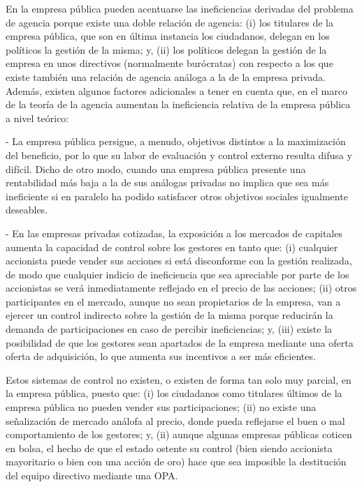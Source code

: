 \documentclass[10pt,a4paper]{article}
\begin{document}
En la empresa pública pueden acentuarse las ineficiencias derivadas del problema de agencia porque existe una doble relación de agencia: (i) los titulares de la empresa pública, que son en última instancia los ciudadanos, delegan en los políticos la gestión de la misma; y, (ii) los políticos delegan la gestión de la empresa en unos directivos (normalmente burócratas) con respecto a los que existe también una relación de agencia análoga a la de la empresa privada. Además, existen algunos factores adicionales a tener en cuenta que, en el marco de la teoría de la agencia aumentan la ineficiencia relativa de la empresa pública a nivel teórico:

- La empresa pública persigue, a menudo, objetivos distintos a la maximización del beneficio, por lo que su labor de evaluación y control externo resulta difusa y difícil. Dicho de otro modo, cuando una empresa pública presente una rentabilidad más baja a la de sus análogas privadas no implica que sea más ineficiente si en paralelo ha podido satisfacer otros objetivos sociales igualmente deseables.

- En las empresas privadas cotizadas, la exposición a los mercados de capitales aumenta la capacidad de control sobre los gestores en tanto que: (i) cualquier accionista puede vender sus acciones si está disconforme con la gestión realizada, de modo que cualquier indicio de ineficiencia que sea apreciable por parte de los accionistas se verá inmediatamente reflejado en el precio de las acciones; (ii) otros participantes en el mercado, aunque no sean propietarios de la empresa, van a ejercer un control indirecto sobre la gestión de la misma porque reducirán la demanda de participaciones en caso de percibir ineficiencias; y, (iii) existe la posibilidad de que los gestores sean apartados de la empresa mediante una oferta oferta de adquisición, lo que aumenta sus incentivos a ser más eficientes.

Estos sistemas de control no existen, o existen de forma tan solo muy parcial, en la empresa pública, puesto que: (i) los ciudadanos como titulares últimos de la empresa pública no pueden vender sus participaciones; (ii) no existe una señalización de mercado análofa al precio, donde pueda reflejarse el buen o mal comportamiento de los gestores; y, (ii) aunque algunas empresas públicas coticen en bolsa, el hecho de que el estado ostente su control (bien siendo accionista mayoritario o bien con una acción de oro) hace que sea imposible la destitución del equipo directivo mediante una OPA.
\end{document}
